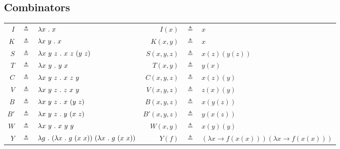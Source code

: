 \documentclass{report}
\begin{document}
\subsection*{Combinators}
\begin{center}
	\begin{tabular}{r c l r c l }
		$I $  & $\triangleq $ & $\lambda x \ . \ x$                                                                                                    & $I(x) $      & $\triangleq$ & $ x$                                              \\
		$K $  & $\triangleq $ & $\lambfun{\lambarg{x}{y}}{x}$                                                                                       & $K(x,y) $    & $\triangleq$ & $ x$                                              \\
		$S $  & $\triangleq $ & $\lambfun{\lambarg{x}{y}{z}}{\lambapp{\lambapp{x}{z}}{(\lambapp{y}{z})}}$                                           & $S(x,y,z) $  & $\triangleq$ & $ x(z)(y(z))$                                     \\
		$T $  & $\triangleq $ & $\lambfun{\lambarg{x}{y}}{\lambapp{y}{x}}$                                                                          & $T(x,y) $    & $\triangleq$ & $ y(x)$                                           \\
		$C $  & $\triangleq $ & $\lambfun{\lambarg{x}{y}{z}}{\lambapp{\lambapp{x}{z}}{y}}$                                                          & $C(x,y,z) $  & $\triangleq$ & $ x(z)(y)$                                        \\
		$V $  & $\triangleq $ & $\lambfun{\lambarg{x}{y}{z}}{\lambapp{\lambapp{z}{x}}{y}}$                                                          & $V(x,y,z) $  & $\triangleq$ & $ z(x)(y)$                                        \\
		$B $  & $\triangleq $ & $\lambfun{\lambarg{x}{y}{z}}{\lambapp{x}{(\lambapp{y}{z})}}$                                                        & $B(x,y,z) $  & $\triangleq$ & $ x(y(z))$                                        \\
		$B' $ & $\triangleq $ & $\lambfun{\lambarg{x}{y}{z}}{\lambapp{y}{(\lambapp{x}{z})}}$                                                        & $B'(x,y,z) $ & $\triangleq$ & $ y(x(z))$                                        \\
		$W $  & $\triangleq $ & $ \lambfun{\lambarg{x}{y}}{\lambapp{\lambapp{x}{y}}{y}}$                                                            & $W(x,y)$     & $\triangleq$ & $x(y)(y)$                                         \\
		$Y$   & $\triangleq$  & $\lambda g \ . \ (\lambda x \ . \ g \ (x \ x)) \ (\lambda x \ . \ g \ (x \ x))$ & $Y(f) $      & $\triangleq$ & $ (\lambda x \to f(x(x)))(\lambda x \to f(x(x)))$
	\end{tabular}
\end{center}
\end{document}
